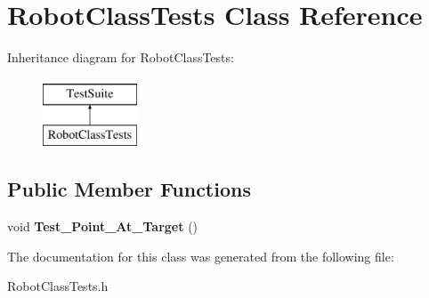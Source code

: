\hypertarget{classRobotClassTests}{\section{Robot\-Class\-Tests Class Reference}
\label{classRobotClassTests}
}
Inheritance diagram for Robot\-Class\-Tests\-:\begin{figure}[H]
\begin{center}
\leavevmode
\includegraphics[height=2.000000cm]{classRobotClassTests}
\end{center}
\end{figure}
\subsection*{Public Member Functions}
\begin{DoxyCompactItemize}
\item 
\hypertarget{classRobotClassTests_a84d517e9fb96fbb8f3c3bfcc7e3bf4a5}{void {\bfseries Test\-\_\-\-Point\-\_\-\-At\-\_\-\-Target} ()}\label{classRobotClassTests_a84d517e9fb96fbb8f3c3bfcc7e3bf4a5}

\end{DoxyCompactItemize}


The documentation for this class was generated from the following file\-:\begin{DoxyCompactItemize}
\item 
Robot\-Class\-Tests.\-h\end{DoxyCompactItemize}
